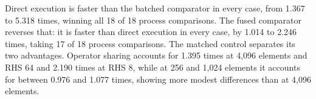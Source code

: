 Direct execution is faster than the batched comparator in every case, from 1.367 to 5.318 times, winning all 18 of 18 process comparisons. The fused comparator reverses that: it is faster than direct execution in every case, by 1.014 to 2.246 times, taking 17 of 18 process comparisons. The matched control separates its two advantages. Operator sharing accounts for 1.395 times at 4,096 elements and RHS 64 and 2.190 times at RHS 8, while at 256 and 1,024 elements it accounts for between 0.976 and 1.077 times, showing more modest differences than at 4,096 elements.
